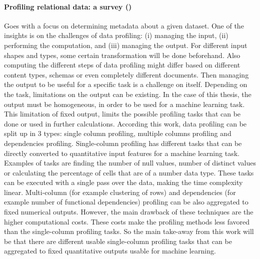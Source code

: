 \paragraph{Profiling relational data: a survey (\cite{Abedjan2015-ul})} 
Goes with a focus on determining metadata about a given dataset. One of the insights is on the challenges of data profiling: (i) managing the input, (ii) performing the computation, and (iii) managing the output. For different input shapes and types, some certain transformation will be done beforehand. Also computing the different steps of data profiling might differ based on different content types, schemas or even completely different documents. Then managing the output to be useful for a specific task is a challenge on itself. Depending on the task, limitations on the output can be existing. In the case of this thesis, the output must be homogeneous, in order to be used for a machine learning task. 
This limitation of fixed output, limits the possible profiling tasks that can be done or used in further calculations. According this work, data profiling can be split up in 3 types: single column profiling, multiple columns profiling and dependencies profiling. 
Single-column profiling has different tasks that can be directly converted to quantitative input features for a machine learning task. Examples of tasks are finding the number of null values, number of distinct values or calculating the percentage of cells that are of a number data type. These tasks can be executed with a single pass over the data, making the time complexity linear. 
Multi-column (for example clustering of rows) and dependencies (for example number of functional dependencies) profiling can be also aggregated to fixed numerical outputs. However, the main drawback of these techniques are the higher computational costs. These costs make the profiling methods less favored than the single-column profiling tasks.
So the main take-away from this work will be that there are different usable single-column profiling tasks that can be aggregated to fixed quantitative outputs usable for machine learning.
